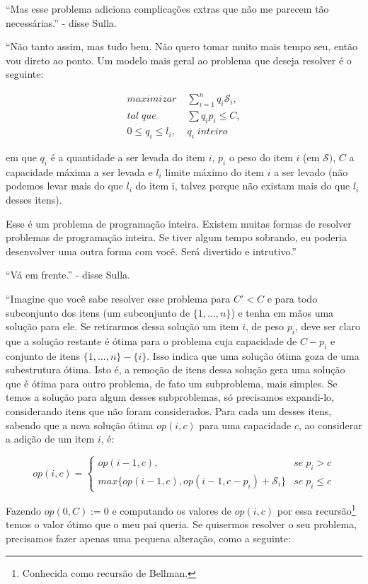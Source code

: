 \documentclass{article}
\begin{document}
``Mas esse problema adiciona complicações extras que não me parecem tão necessárias.'' - disse
Sulla.

``Não tanto assim, mas tudo bem. Não quero tomar muito mais tempo seu, então vou direto ao ponto. Um
modelo mais geral ao problema que deseja resolver é o seguinte:

\begin{align*}
  maximizar \;& \sum\limits_{i=1}^n q_i \mathscr{S}_i,\\
  tal\; que\;& \sum{q_i p_i} \leq C,\\
  0 \leq q_i \leq l_i,\; & q_i \; inteiro
\end{align*}

\noindent em que $q_i$ é a quantidade a ser levada do item $i$, $p_i$ o peso do item $i$ (em
$\mathscr{S})$, $C$ a capacidade máxima a ser levada e $l_i$ limite máximo do item $i$ a ser
levado (não podemos levar mais do que $l_i$ do item i, talvez porque não existam mais do que $l_i$
desses itens).

Esse é um problema de programação inteira. Existem muitas formas de resolver problemas de
programação inteira. Se tiver algum tempo sobrando, eu poderia desenvolver uma outra forma com
você. Será divertido e intrutivo.''

``Vá em frente.'' - disse Sulla.

``Imagine que você sabe resolver esse problema para $C' < C$ e para todo subconjunto dos itens (um
subconjunto de $\{1, ..., n\}$) e tenha em mãos uma solução para ele. Se retirarmos dessa solução um item $i$, de peso $p_i$, deve ser
claro que a solução restante é ótima para o problema cuja capacidade de $C - p_i$ e conjunto de
itens $\{1, ..., n\}-\{i\}$. Isso indica que uma solução ótima goza de uma subestrutura ótima. Isto é, a
remoção de itens dessa solução gera uma solução que é ótima para outro problema, de fato um
subproblema, mais simples. Se temos a solução para algum desses subproblemas, só precisamos
expandi-lo, considerando itens que não foram considerados. Para cada um desses itens, sabendo que a
nova solução ótima $op(i,c)$ para uma capacidade $c$, ao considerar a adição de um item $i$, é:

\[
  op(i,c) =
  \begin{cases}
    op(i-1, c),  & se\; p_i > c\\
    max\{op(i-1, c), op(i-1, c-p_i) + \mathscr{S}_i\} & se\; p_i \leq c
  \end{cases}
\]

Fazendo $op(0, C) := 0$ e computando os valores de $op(i, c)$ por essa recursão\footnote{Conhecida
como recursão de Bellman.} temos o valor ótimo que o meu pai queria. Se quisermos resolver o seu
problema, precisamos fazer apenas uma pequena alteração, como a seguinte:
\end{document}
